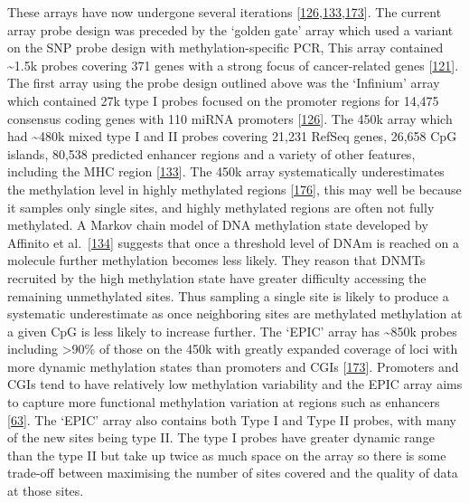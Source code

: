 \documentclass[
]{book}
\begin{document}
These arrays have now undergone several iterations {[}\protect\hyperlink{ref-Bibikova2009}{126},\protect\hyperlink{ref-Bibikova2011}{133},\protect\hyperlink{ref-Moran2015}{173}{]}.
The current array probe design was preceded by the `golden gate' array which used a variant on the SNP probe design with methylation-specific PCR, This array contained \textasciitilde1.5k probes covering 371 genes with a strong focus of cancer-related genes {[}\protect\hyperlink{ref-Bibikova2006}{121}{]}.
The first array using the probe design outlined above was the `Infinium' array which contained 27k type I probes focused on the promoter regions for 14,475 consensus coding genes with 110 miRNA promoters {[}\protect\hyperlink{ref-Bibikova2009}{126}{]}.
The 450k array which had \textasciitilde480k mixed type I and II probes covering 21,231 RefSeq genes, 26,658 CpG islands, 80,538 predicted enhancer regions and a variety of other features, including the MHC region {[}\protect\hyperlink{ref-Bibikova2011}{133}{]}.
The 450k array systematically underestimates the methylation level in highly methylated regions {[}\protect\hyperlink{ref-Clark2012}{176}{]}, this may well be because it samples only single sites, and highly methylated regions are often not fully methylated.
A Markov chain model of DNA methylation state developed by Affinito et al.~{[}\protect\hyperlink{ref-Affinito2016}{134}{]} suggests that once a threshold level of DNAm is reached on a molecule further methylation becomes less likely.
They reason that DNMTs recruited by the high methylation state have greater difficulty accessing the remaining unmethylated sites.
Thus sampling a single site is likely to produce a systematic underestimate as once neighboring sites are methylated methylation at a given CpG is less likely to increase further.
The `EPIC' array has \textasciitilde850k probes including \textgreater90\% of those on the 450k with greatly expanded coverage of loci with more dynamic methylation states than promoters and CGIs {[}\protect\hyperlink{ref-Moran2015}{173}{]}.
Promoters and CGIs tend to have relatively low methylation variability and the EPIC array aims to capture more functional methylation variation at regions such as enhancers {[}\protect\hyperlink{ref-Ziller2013}{63}{]}.
The `EPIC' array also contains both Type I and Type II probes, with many of the new sites being type II.
The type I probes have greater dynamic range than the type II but take up twice as much space on the array so there is some trade-off between maximising the number of sites covered and the quality of data at those sites.
\end{document}
